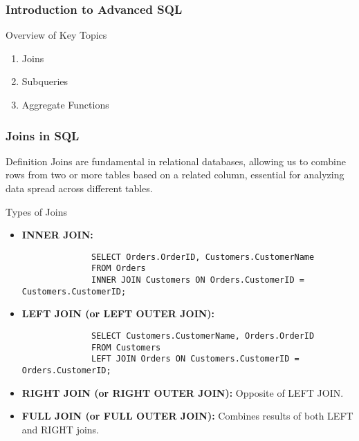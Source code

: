 \documentclass[aspectratio=169]{beamer}
\begin{document}
\frame{\titlepage}

\begin{frame}[fragile]
    \frametitle{Introduction to Advanced SQL}
    \begin{block}{Overview of Key Topics}
        \begin{enumerate}
            \item Joins
            \item Subqueries
            \item Aggregate Functions
        \end{enumerate}
    \end{block}
\end{frame}

\begin{frame}[fragile]
    \frametitle{Joins in SQL}
    \begin{block}{Definition}
        Joins are fundamental in relational databases, allowing us to combine rows from two or more tables based on a related column, essential for analyzing data spread across different tables.
    \end{block}

    \begin{block}{Types of Joins}
        \begin{itemize}
            \item \textbf{INNER JOIN:} 
            \begin{lstlisting}
              SELECT Orders.OrderID, Customers.CustomerName
              FROM Orders
              INNER JOIN Customers ON Orders.CustomerID = Customers.CustomerID;
            \end{lstlisting}
            \item \textbf{LEFT JOIN (or LEFT OUTER JOIN):}
            \begin{lstlisting}
              SELECT Customers.CustomerName, Orders.OrderID
              FROM Customers
              LEFT JOIN Orders ON Customers.CustomerID = Orders.CustomerID;
            \end{lstlisting}
            \item \textbf{RIGHT JOIN (or RIGHT OUTER JOIN):} Opposite of LEFT JOIN.
            \item \textbf{FULL JOIN (or FULL OUTER JOIN):} Combines results of both LEFT and RIGHT joins.
        \end{itemize}
    \end{block}
\end{frame}
\end{document}
